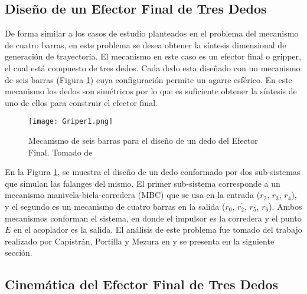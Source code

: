 \subsection{Diseño de un Efector Final de Tres Dedos}
De forma similar a los casos de estudio planteados en el problema del mecanismo de cuatro barras, en este problema se desea obtener la síntesis dimensional de generación de trayectoria. El mecanismo en este caso es un efector final o gripper, el cual está compuesto de tres dedos. Cada dedo esta diseñado con un mecanismo de seis barras (Figura \ref{fig:Griper}) cuya configuración permite un agarre esférico. En este mecanismo los dedos son simétricos por lo que es suficiente obtener la síntesis de uno de ellos para construir el efector final.
\begin{figure}[htb]
    \centering
     \texttt{[image: Griper1.png]}
    \caption [Mecanismo de seis barras para el diseño de un dedo del Efector Final.]{Mecanismo de seis barras para el diseño de un dedo del Efector Final. Tomado de \cite{zapata_zapata_control_2017} }
    \label{fig:Griper}
\end{figure}

En la Figura \ref{fig:Griper}, se muestra el diseño de un dedo conformado por dos sub-sistemas que simulan las falanges del mismo. El primer sub-sistema corresponde a un mecanismo manivela-biela-corredera (MBC) que se usa en la entrada ($r_2$, $r_3$, $r_4$), y el segundo es un mecanismo de cuatro barras en la salida ($r_0$, $r^{\prime}_2$, $r_5$, $r_6$). Ambos mecanismos conforman el sistema, en donde el impulsor es la corredera y el punto $E$ en el acoplador es la salida. El análisis de este problema fue tomado del trabajo realizado por Capistrán, Portilla y Mezura en \cite{capistran_2015} y se presenta en la siguiente sección.


\subsection{Cinemática del Efector Final de Tres Dedos }


